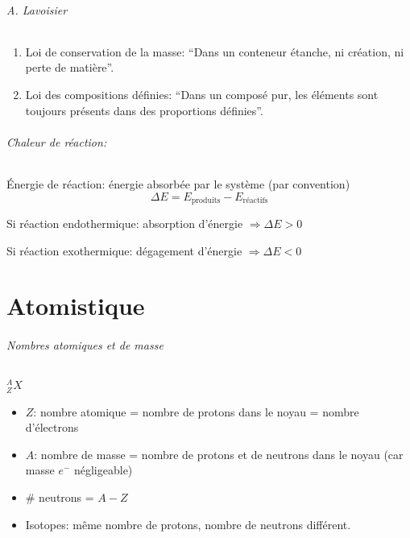 \paragraph{A. Lavoisier}
\begin{enumerate}
	\item Loi de conservation de la masse: ``Dans un conteneur étanche, ni création, ni perte de matière''.
	\item Loi des compositions définies: ``Dans un composé pur, les éléments sont toujours présents dans des proportions définies''.
\end{enumerate}

\paragraph{Chaleur de réaction:}
\'Energie de réaction: énergie absorbée par le système (par convention)
$$\Delta E = E_{\textrm{produits}}-E_{\textrm{réactifs}}$$

Si réaction endothermique: absorption d'énergie $\Rightarrow \Delta E > 0$

Si réaction exothermique: dégagement d'énergie $\Rightarrow  \Delta E < 0$

\part{Atomistique}



\paragraph{Nombres atomiques et de masse}

\emph{$^{A}_{Z}X$}
\begin{itemize}
	\item $Z$: nombre atomique = nombre de protons dans le noyau = nombre d'électrons
	\item $A$: nombre de masse = nombre de protons et de neutrons dans le noyau (car masse $e^{-}$ négligeable)
	\item \# neutrons = $A-Z$
	\item Isotopes: même nombre de protons, nombre de neutrons différent.
\end{itemize}

